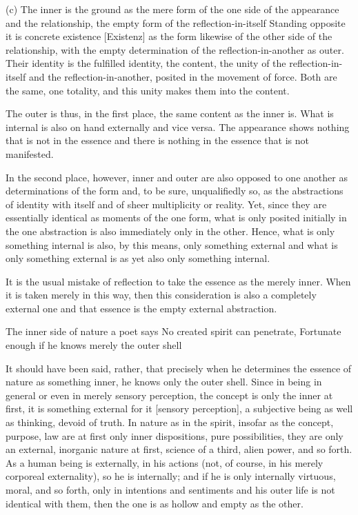 (c) The inner is the ground as the mere form of the one side of the
appearance and the relationship, the empty form of the reflection-in-itself
Standing opposite it is concrete existence [Existenz] as the form likewise
of the other side of the relationship, with the empty determination of the
reflection-in-another as outer. Their identity is the fulfilled identity, the
content, the unity of the reflection-in-itself and the reflection-in-another,
posited in the movement of force. Both are the same, one totality, and this
unity makes them into the content.

The outer is thus, in the first place, the same content as the inner is.
What is internal is also on hand externally and vice versa.
The appearance shows nothing that is not in the essence and
there is nothing in the essence that is not manifested.

In the second place, however, inner and outer are also opposed to one another
as determinations of the form and, to be sure, unqualifiedly so,
as the abstractions of identity with itself and of sheer multiplicity or reality.
Yet, since they are essentially identical as moments of the one
form, what is only posited initially in the one abstraction is also immediately
only in the other.
Hence, what is only something internal is also, by this means,
only something external and what is only something external is as
yet also only something internal.

It is the usual mistake of reflection
to take the essence as the merely inner.
When it is taken merely in this way,
then this consideration is
also a completely external one and
that essence is the empty external abstraction.

    The inner side of nature a poet says
    No created spirit can penetrate,
    Fortunate enough if he knows merely the outer shell

It should have been said, rather, that precisely when he determines
the essence of nature as something inner, he knows only the outer shell.
Since in being in general or even in merely sensory perception,
the concept is only the inner at first,
it is something external for it [sensory perception],
a subjective being as well as thinking, devoid of truth.
In nature as in the spirit, insofar as
the concept, purpose, law are at first
only inner dispositions, pure possibilities,
they are only an external, inorganic nature at first,
science of a third, alien power, and so forth.
As a human being is externally, in his actions
(not, of course, in his merely corporeal externality),
so he is internally;
and if he is only internally virtuous, moral, and so forth,
only in intentions and sentiments
and his outer life is not identical with them,
then the one is as hollow and empty as the other.

